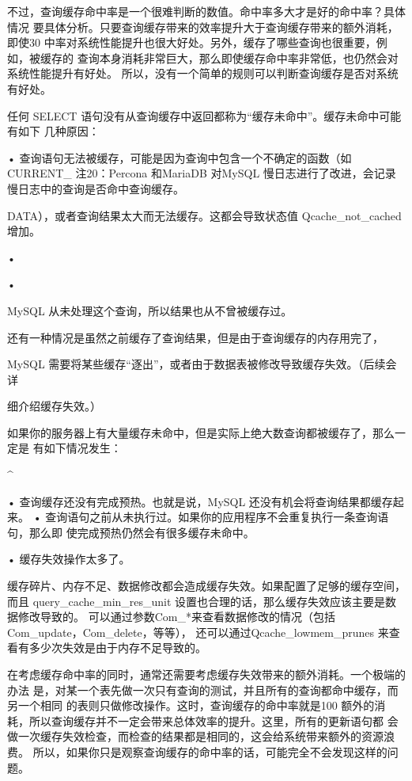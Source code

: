 不过，查询缓存命中率是一个很难判断的数值。命中率多大才是好的命中率？具体情况
要具体分析。只要查询缓存带来的效率提升大于查询缓存带来的额外消耗，即使30%
中率对系统性能提升也很大好处。另外，缓存了哪些查询也很重要，例如，被缓存的
查询本身消耗非常巨大，那么即使缓存命中率非常低，也仍然会对系统性能提升有好处。
所以，没有一个简单的规则可以判断查询缓存是否对系统有好处。

任何 SELECT 语句没有从查询缓存中返回都称为“缓存未命中”。缓存未命中可能有如下
几种原因：

• 查询语句无法被缓存，可能是因为查询中包含一个不确定的函数（如CURRENT\_
注20：Percona 和MariaDB 对MySQL 慢日志进行了改进，会记录慢日志中的查询是否命中查询缓存。

DATA），或者查询结果太大而无法缓存。这都会导致状态值 Qcache\_not\_cached 增加。

•

•

MySQL 从未处理这个查询，所以结果也从不曾被缓存过。

还有一种情况是虽然之前缓存了查询结果，但是由于查询缓存的内存用完了，

MySQL 需要将某些缓存“逐出”，或者由于数据表被修改导致缓存失效。（后续会详

细介绍缓存失效。）

如果你的服务器上有大量缓存未命中，但是实际上绝大数查询都被缓存了，那么一定是
有如下情况发生：

^

• 查询缓存还没有完成预热。也就是说，MySQL 还没有机会将查询结果都缓存起来。
• 查询语句之前从未执行过。如果你的应用程序不会重复执行一条查询语句，那么即
使完成预热仍然会有很多缓存未命中。

• 缓存失效操作太多了。

缓存碎片、内存不足、数据修改都会造成缓存失效。如果配置了足够的缓存空间，而且
query\_cache\_min\_res\_unit 设置也合理的话，那么缓存失效应该主要是数据修改导致的。
可以通过参数Com\_*来查看数据修改的情况（包括Com\_update，Com\_delete，等等），
还可以通过Qcache\_lowmem\_prunes 来查看有多少次失效是由于内存不足导致的。

在考虑缓存命中率的同时，通常还需要考虑缓存失效带来的额外消耗。一个极端的办法
是，对某一个表先做一次只有查询的测试，并且所有的查询都命中缓存，而另一个相同
的表则只做修改操作。这时，查询缓存的命中率就是100%
额外的消耗，所以查询缓存并不一定会带来总体效率的提升。这里，所有的更新语句都
会做一次缓存失效检查，而检查的结果都是相同的，这会给系统带来额外的资源浪费。
所以，如果你只是观察查询缓存的命中率的话，可能完全不会发现这样的问题。

